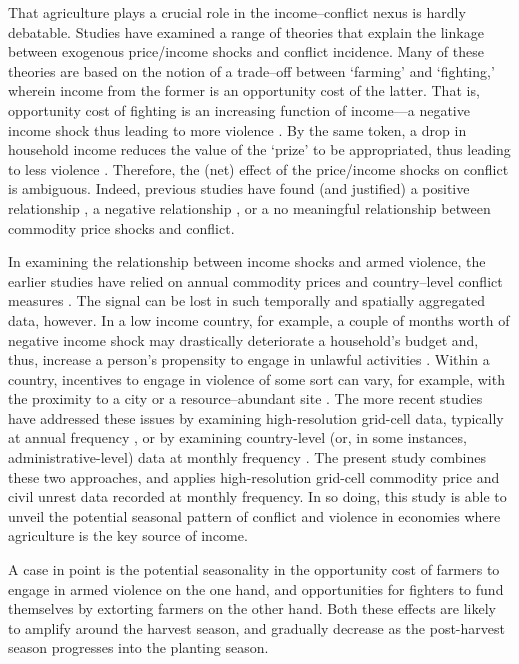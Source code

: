 \documentclass[11pt]{article}
\begin{document}
That agriculture plays a crucial role in the income--conflict nexus is hardly debatable. Studies have examined a range of theories that explain the linkage between exogenous price/income shocks and conflict incidence. Many of these theories are based on the notion of a trade--off between `farming' and `fighting,' wherein income from the former is an opportunity cost of the latter. That is, opportunity cost of fighting is an increasing function of income---a negative income shock thus leading to more violence \citep{collier1998,bazzi2014}. By the same token, a drop in household income reduces the value of the `prize' to be appropriated, thus leading to less violence \citep{berman2015}. Therefore, the (net) effect of the price/income shocks on conflict is ambiguous. Indeed, previous studies have found (and justified) a positive relationship \citep[e.g.,][]{crost2020,mcguirk2020}, a negative relationship \citep[e.g.,][]{berman2015,fjelde2015}, or a no meaningful relationship \citep[e.g.,][]{bazzi2014} between commodity price shocks and conflict. 

In examining the relationship between income shocks and armed violence, the earlier studies have relied on annual commodity prices and country--level conflict measures \citep[e.g.,][]{miguel2004,bruckner2010,bazzi2014}. The signal can be lost in such temporally and spatially aggregated data, however. In a low income country, for example, a couple of months worth of negative income shock may drastically deteriorate a household's budget and, thus, increase a person's propensity to engage in unlawful activities \citep[e.g.,][]{bellemare2015}. Within a country, incentives to engage in violence of some sort can vary, for example, with the proximity to a city or a resource--abundant site \citep[e.g.,][]{berman2017,koren2017}. The more recent studies have addressed these issues by examining high-resolution grid-cell data, typically at annual frequency \citep[e.g.,][]{fjelde2015,berman2015,berman2017,koren2018}, or by examining country-level (or, in some instances, administrative-level) data at monthly frequency \citep[e.g.,][]{maystadt2014,smith2014,bellemare2015}. The present study combines these two approaches, and applies high-resolution grid-cell commodity price and civil unrest data recorded at monthly frequency. In so doing, this study is able to unveil the potential seasonal pattern of conflict and violence in economies where agriculture is the key source of income.

A case in point is the potential seasonality in the opportunity cost of farmers to engage in armed violence on the one hand, and opportunities for fighters to fund themselves by extorting farmers on the other hand. Both these effects are likely to amplify around the harvest season, and gradually decrease as the post-harvest season progresses into the planting season. 
\end{document}
